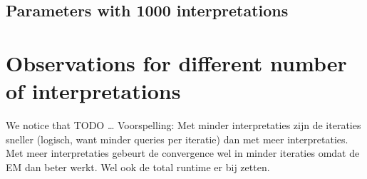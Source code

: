 \subsection{Parameters with 1000 interpretations}


\section{Observations for different number of interpretations}
We notice that TODO \ldots
Voorspelling: Met minder interpretaties zijn de iteraties sneller (logisch, want minder queries per iteratie) dan met meer interpretaties. Met meer interpretaties gebeurt de convergence wel in minder iteraties omdat de EM dan beter werkt. Wel ook de total runtime er bij zetten.